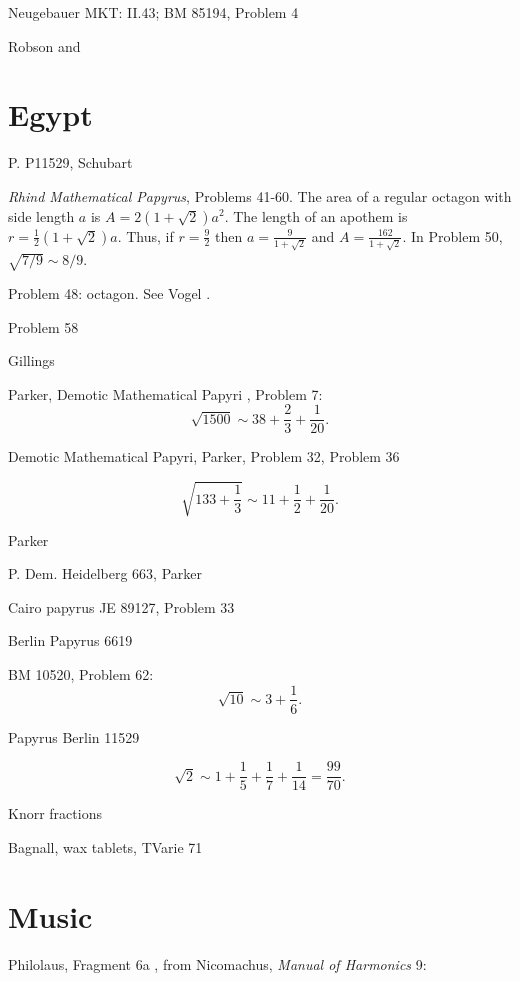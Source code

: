 \documentclass{amsart}
\theoremstyle{definition}
\begin{document}
Neugebauer \cite{MKT} MKT: II.43; BM 85194, Problem 4

Robson \cite{robson} and \cite{robson1999}







\section{Egypt}
P. P11529, Schubart \cite{P11529}

{\em Rhind Mathematical Papyrus}, Problems 41-60. The area of a regular octagon with side length $a$ is 
$A=2(1+\sqrt{2})a^2$. The length of an apothem is $r=\frac{1}{2}(1+\sqrt{2})a$. 
Thus, if $r=\frac{9}{2}$ then $a=\frac{9}{1+\sqrt{2}}$ and $A=\frac{162}{1+\sqrt{2}}$. In Problem 50, $\sqrt{7/9} \sim 8/9$.

Problem 48: octagon. See Vogel \cite[p.~66]{vogel}.

Problem 58 \cite[p.~167]{egyptian3}

Gillings \cite{gillings}

Parker, Demotic Mathematical Papyri \cite{DMP}, Problem 7:
\[
\sqrt{1500} \sim 38+\frac{2}{3}+\frac{1}{20}.
\]

Demotic Mathematical Papyri, Parker, Problem 32, Problem 36

\[
\sqrt{133+\frac{1}{3}} \sim 11+\frac{1}{2}+\frac{1}{20}.
\]

Parker \cite{parker1969}

P. Dem. Heidelberg 663, Parker \cite{Heidelberg663}

Cairo papyrus JE 89127, Problem 33

Berlin Papyrus 6619

BM 10520, Problem 62:
\[
\sqrt{10} \sim 3+\frac{1}{6}.
\]

Papyrus Berlin 11529

\[
\sqrt{2} \sim 1 + \frac{1}{5}+\frac{1}{7}+\frac{1}{14} = \frac{99}{70}.
\]

Knorr \cite{knorr1982} fractions

Bagnall, wax tablets, TVarie 71 \cite{bagnall}






\section{Music}
Philolaus, Fragment 6a  \cite[pp.~146--147]{philolaus},  from Nicomachus, {\em Manual of Harmonics} 9:
\end{document}
